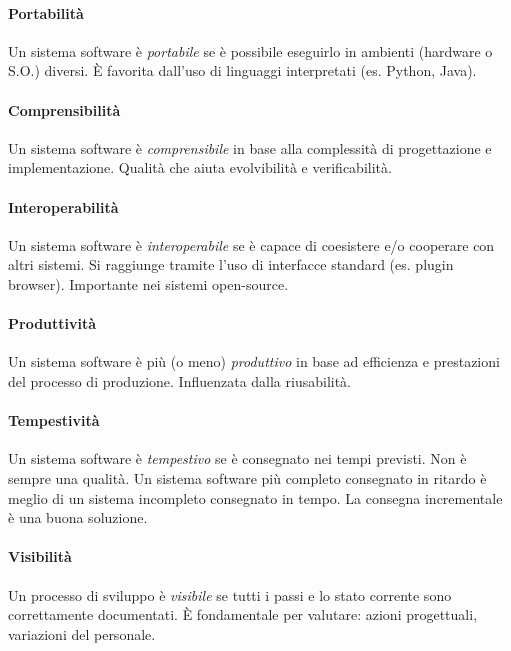 \paragraph{Portabilità} Un sistema software è \textit{portabile} se è possibile eseguirlo in ambienti (hardware o S.O.) diversi. È favorita dall'uso di linguaggi interpretati (es. Python, Java).

\paragraph{Comprensibilità} Un sistema software è \textit{comprensibile} in base alla complessità di progettazione e implementazione. Qualità che aiuta evolvibilità e verificabilità.

\paragraph{Interoperabilità} Un sistema software è \textit{interoperabile} se è capace di coesistere e/o cooperare con altri sistemi. Si raggiunge tramite l'uso di interfacce standard (es. plugin browser). Importante nei sistemi open-source.

\paragraph{Produttività} Un sistema software è più (o meno) \textit{produttivo} in base ad efficienza e prestazioni del processo di produzione. Influenzata dalla riusabilità.

\paragraph{Tempestività} Un sistema software è \textit{tempestivo} se è consegnato nei tempi previsti. Non è sempre una qualità. Un sistema software più completo consegnato in ritardo è meglio di un sistema incompleto consegnato in tempo. La consegna incrementale è una buona soluzione.

\paragraph{Visibilità} Un processo di sviluppo è \textit{visibile} se tutti i passi e lo stato corrente sono correttamente documentati. È fondamentale per valutare: azioni progettuali, variazioni del personale.

\newpage